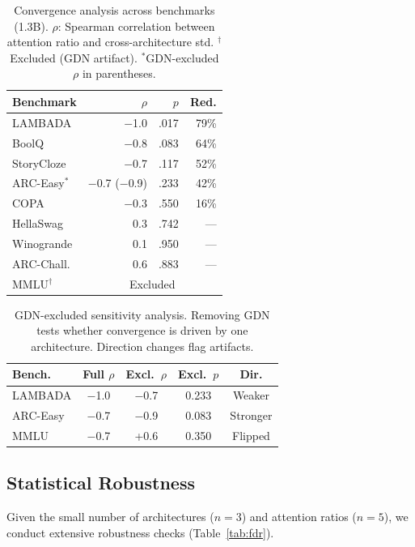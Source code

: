 \documentclass[11pt,twocolumn]{article}
\begin{document}
\begin{table}[t]
\centering
\small
\caption{Convergence analysis across benchmarks (1.3B). $\rho$: Spearman correlation between attention ratio and cross-architecture std. $^\dagger$Excluded (GDN artifact). $^*$GDN-excluded $\rho$ in parentheses.}\label{tab:convergence}
\begin{tabular}{@{}lrrr@{}}
\toprule
\textbf{Benchmark} & \textbf{$\rho$} & \textbf{$p$} & \textbf{Red.} \\
\midrule
LAMBADA & $-$1.0 & .017 & 79\% \\
BoolQ & $-$0.8 & .083 & 64\% \\
StoryCloze & $-$0.7 & .117 & 52\% \\
ARC-Easy$^*$ & $-$0.7 ($-$0.9) & .233 & 42\% \\
\midrule
COPA & $-$0.3 & .550 & 16\% \\
HellaSwag & 0.3 & .742 & --- \\
Winogrande & 0.1 & .950 & --- \\
ARC-Chall. & 0.6 & .883 & --- \\
MMLU$^\dagger$ & \multicolumn{3}{c}{Excluded} \\
\bottomrule
\end{tabular}
\end{table}

\begin{table}[t]
\centering
\small
\caption{GDN-excluded sensitivity analysis. Removing GDN tests whether convergence is driven by one architecture. Direction changes flag artifacts.}\label{tab:sensitivity}
\begin{tabular}{@{}lcccc@{}}
\toprule
\textbf{Bench.} & \textbf{Full $\rho$} & \textbf{Excl.\ $\rho$} & \textbf{Excl.\ $p$} & \textbf{Dir.} \\
\midrule
LAMBADA & $-$1.0 & $-$0.7 & 0.233 & Weaker \\
ARC-Easy & $-$0.7 & $-$0.9 & 0.083 & Stronger \\
MMLU & $-$0.7 & +0.6 & 0.350 & Flipped \\
\bottomrule
\end{tabular}
\end{table}


\subsection{Statistical Robustness}\label{sec:stats}

Given the small number of architectures ($n{=}3$) and attention ratios ($n{=}5$), we conduct extensive robustness checks (Table~\ref{tab:fdr}).
\end{document}
